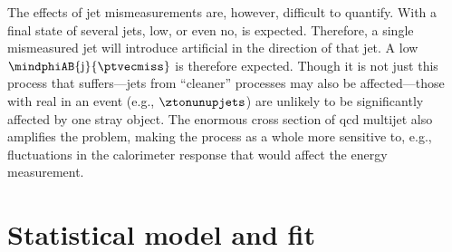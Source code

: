 The effects of \gls{jet} mismeasurements are, however, difficult to quantify. With a final state of several \glspl{jet}, low, or even no, \ptmiss is expected. Therefore, a single mismeasured \gls{jet} will introduce artificial \ptvecmiss in the direction of that jet. A low $\mindphiAB{\mathrm{j}}{\ptvecmiss}$ is therefore expected. Though it is not just this process that suffers---\glspl{jet} from ``cleaner'' processes may also be affected---those with real \ptmiss in an event (e.g., $\ztonunupjets$) are unlikely to be significantly affected by one stray object. The enormous cross section of \acrshort{qcd} multijet also amplifies the problem, making the process as a whole more sensitive to, e.g., fluctuations in the calorimeter response that would affect the energy measurement.




\section{Statistical model and fit}
\label{sec:htoinv_satistical_treatment}





